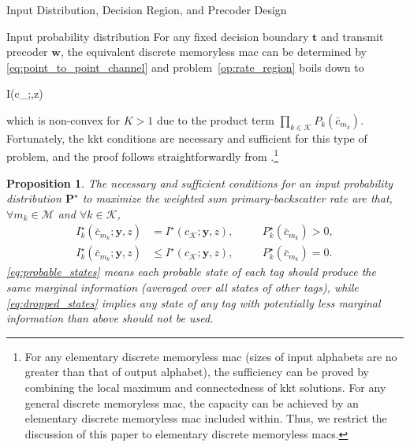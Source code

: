 \documentclass[journal]{IEEEtran}
\newtheorem{proposition}{Proposition}
\begin{document}
\begin{section}{Input Distribution, Decision Region, and Precoder Design}
		\begin{subsection}{Input probability distribution}
			For any fixed decision boundary $\boldsymbol{t}$ and transmit precoder $\boldsymbol{w}$, the equivalent discrete memoryless \gls{mac} can be determined by \eqref{eq:point_to_point_channel} and problem~\eqref{op:rate_region} boils down to
			\begin{maxi!}
				{}{I(c_{};,z)}{\label{op:input_probability_distribution}}{}
				\addConstraint{\eqref{co:sum_probability},\eqref{co:nonnegative_probability},}
			\end{maxi!}
			which is non-convex for $K > 1$ due to the product term $\prod_{k \in \mathcal{K}} P_k(\bar{c}_{m_k})$. Fortunately, the \gls{kkt} conditions are necessary and sufficient for this type of problem, and the proof follows straightforwardly from \cite{Watanabe2009}.\footnote{For any elementary discrete memoryless \gls{mac} (sizes of input alphabets are no greater than that of output alphabet), the sufficiency can be proved by combining the local maximum and connectedness of \gls{kkt} solutions. For any general discrete memoryless \gls{mac}, the capacity can be achieved by an elementary discrete memoryless \gls{mac} included within. Thus, we restrict the discussion of this paper to elementary discrete memoryless \gls{mac}s.}
			\begin{proposition}
				The necessary and sufficient conditions for an input probability distribution $\boldsymbol{P}^{\star}$ to maximize the weighted sum primary-backscatter rate are that, $\forall m_k \in \mathcal{M}$ and $\forall k \in \mathcal{K}$,
				\begin{subequations}
					\label{eq:optimal_conditions}
					\begin{alignat}{2}
						I_k^{\star}(\bar{c}_{m_k};\boldsymbol{y},z) & = I^{\star}(c_{\mathcal{K}};\boldsymbol{y},z), \quad && P_k^{\star}(\bar{c}_{m_k}) > 0,\label{eq:probable_states}\\
						I_k^{\star}(\bar{c}_{m_k};\boldsymbol{y},z) & \le I^{\star}(c_{\mathcal{K}};\boldsymbol{y},z), \quad && P_k^{\star}(\bar{c}_{m_k}) = 0.\label{eq:dropped_states}
					\end{alignat}
				\end{subequations}
				\eqref{eq:probable_states} means each probable state of each tag should produce the same marginal information (averaged over all states of other tags), while \eqref{eq:dropped_states} implies any state of any tag with potentially less marginal information than above should not be used.

\end{proposition}
\end{subsection}
\end{section}
\end{document}
